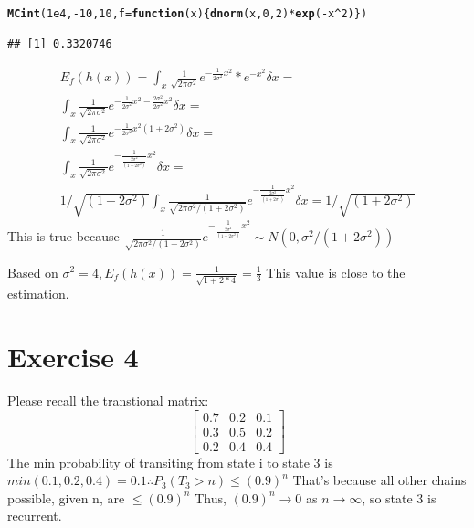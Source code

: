 \documentclass{article}\usepackage[]{graphicx}\usepackage[]{color}
\makeatletter
\newcommand{\hlnum}[1]{\textcolor[rgb]{0.686,0.059,0.569}{#1}}%
\newcommand{\hlopt}[1]{\textcolor[rgb]{0,0,0}{#1}}%
\newcommand{\hlstd}[1]{\textcolor[rgb]{0.345,0.345,0.345}{#1}}%
\newcommand{\hlkwa}[1]{\textcolor[rgb]{0.161,0.373,0.58}{\textbf{#1}}}%
\newcommand{\hlkwc}[1]{\textcolor[rgb]{0.333,0.667,0.333}{#1}}%
\newcommand{\hlkwd}[1]{\textcolor[rgb]{0.737,0.353,0.396}{\textbf{#1}}}%
\newenvironment{kframe}{%
 \def\at@end@of@kframe{}%
 \ifinner\ifhmode%
  \def\at@end@of@kframe{\end{minipage}}%
  \begin{minipage}{\columnwidth}%
 \fi\fi%
 \def\FrameCommand##1{\hskip\@totalleftmargin \hskip-\fboxsep
 \colorbox{shadecolor}{##1}\hskip-\fboxsep
     \hskip-\linewidth \hskip-\@totalleftmargin \hskip\columnwidth}%
 \MakeFramed {\advance\hsize-\width
   \@totalleftmargin\z@ \linewidth\hsize
   \@setminipage}}%
 {\par\unskip\endMakeFramed%
 \at@end@of@kframe}
\newenvironment{knitrout}{}{} %
\makeatother
\begin{document}
\begin{knitrout}
\color{fgcolor}\begin{kframe}
\begin{alltt}
\hlkwd{MCint}\hlstd{(}\hlnum{1e4}\hlstd{,} \hlopt{-}\hlnum{10}\hlstd{,}\hlnum{10}\hlstd{,} \hlkwc{f} \hlstd{=} \hlkwa{function}\hlstd{(}\hlkwc{x}\hlstd{)\{}\hlkwd{dnorm}\hlstd{(x,}\hlnum{0}\hlstd{,}\hlnum{2}\hlstd{)}\hlopt{*}\hlkwd{exp}\hlstd{(}\hlopt{-}\hlstd{x}\hlopt{^}\hlnum{2}\hlstd{)\})}
\end{alltt}
\begin{verbatim}
## [1] 0.3320746
\end{verbatim}
\end{kframe}
\end{knitrout}
\begin{equation}
\begin{split}
E_{f}(h(x)) = \int_{x}\frac{1}{\sqrt{2\pi\sigma^{2}}}e^{-\frac{1}{2\sigma^2}x^2}*e^{-x^2} \delta x = \\
\int_{x}\frac{1}{\sqrt{2\pi\sigma^{2}}}e^{-\frac{1}{2\sigma^2}x^2 -\frac{2\sigma^2}{2\sigma^2}x^2} \delta x = \\
\int_{x}\frac{1}{\sqrt{2\pi\sigma^{2}}}e^{-\frac{1}{2\sigma^2}x^2(1+2\sigma^2)} \delta x = \\
\int_{x}\frac{1}{\sqrt{2\pi\sigma^{2}}}e^{-\frac{1}{\frac{2\sigma^2}{(1+2\sigma^2)}}x^2} \delta x = \\
1/\sqrt{(1+2\sigma^2)}\int_{x}\frac{1}{\sqrt{2\pi\sigma^{2}/(1+2\sigma^2)}}e^{-\frac{1}{\frac{2\sigma^2}{(1+2\sigma^2)}}x^2} \delta x =
1/\sqrt{(1+2\sigma^2)}
\end{split}
\end{equation}
This is true because $\frac{1}{\sqrt{2\pi\sigma^{2}/(1+2\sigma^2)}}e^{-\frac{1}{\frac{2\sigma^2}{(1+2\sigma^2)}}x^2}\sim N(0, \sigma^2/(1+2\sigma^2))$

Based on $\sigma^{2} = 4, E_{f}(h(x)) = \frac{1}{\sqrt{1+2*4}}=\frac{1}{3}$ This value is close to the estimation.
\section*{Exercise 4}
Please recall the transtional matrix:
\begin{equation}
\left[\begin{array}{ccc}
0.7 & 0.2 & 0.1\\
0.3 & 0.5 & 0.2\\
0.2 & 0.4 & 0.4
\end{array}\right]
\end{equation}
The min probability of transiting from state i to state 3 is $min(0.1, 0.2,0.4)=0.1\therefore P_{3}(T_{3}>n)\leq (0.9)^{n}$ That's because all other chains possible, given n, are $\leq (0.9)^{n}$
Thus, $(0.9)^{n} \rightarrow 0$ as $n \rightarrow \infty$, so state 3 is recurrent.
\end{document}
